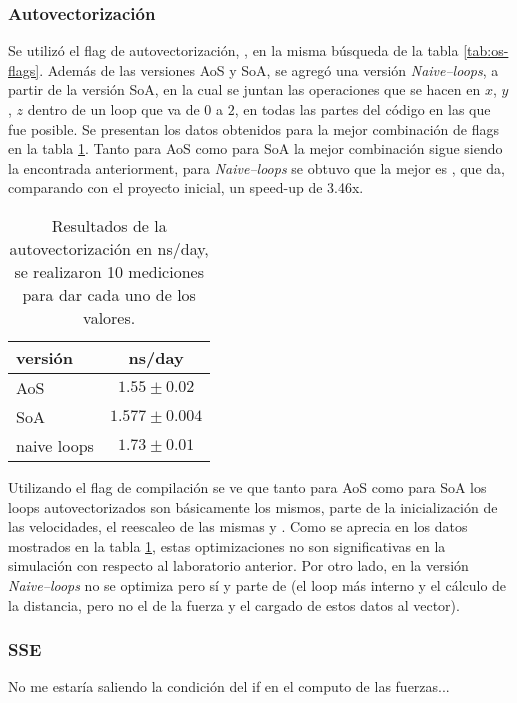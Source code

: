 \documentclass[a4paper,spanish,12pt,twoside]{article}
\begin{document}
\subsubsection*{Autovectorización}

Se utilizó el flag de autovectorización, , en la misma búsqueda de la tabla \ref{tab:os-flags}. Además de las versiones AoS y SoA, se agregó una versión \textit{Naive--loops}, a partir de la versión SoA, en la cual se juntan las operaciones que se hacen en $x$, $y$, $z$ dentro de un loop que va de $0$ a $2$, en todas las partes del código en las que fue posible. Se presentan los datos obtenidos para la mejor combinación de flags en la tabla \ref{tab:autovec}. Tanto para AoS como para SoA la mejor combinación sigue siendo la encontrada anteriorment, para \textit{Naive--loops} se obtuvo que la mejor es , que da, comparando con el proyecto inicial, un speed-up de 3.46x.

\begin{table}[h]
	\centering
	\caption{Resultados de la autovectorización en ns/day, se realizaron 10 mediciones para dar cada uno de los valores.}
	\label{tab:autovec}
	\begin{tabular}{|l|c|}
		\hline
	    versión  	& ns/day           \\
	    \hline
		AoS         & $1.55 \pm 0.02$  \\ 
		SoA         & $1.577 \pm 0.004$  \\
		naive loops & $1.73 \pm 0.01$  \\
		\hline
	\end{tabular}
\end{table}

Utilizando el flag de compilación  se ve que tanto para AoS como para SoA los loops autovectorizados son básicamente los mismos, parte de la inicialización de las velocidades, el reescaleo de las mismas y . Como se aprecia en los datos mostrados en la tabla \ref{tab:autovec}, estas optimizaciones no son significativas en la simulación con respecto al laboratorio anterior. Por otro lado, en la versión \textit{Naive--loops} no se optimiza  pero sí  y parte de  (el loop más interno y el cálculo de la distancia, pero no el de la fuerza y el cargado de estos datos al vector).

\subsubsection*{SSE}
No me estaría saliendo la condición del if en el computo de las fuerzas...
\end{document}
